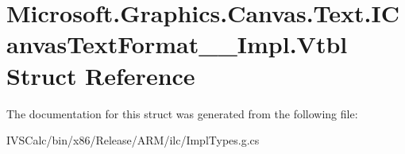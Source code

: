 \hypertarget{struct_microsoft_1_1_graphics_1_1_canvas_1_1_text_1_1_i_canvas_text_format_____impl_1_1_vtbl}{}\section{Microsoft.\+Graphics.\+Canvas.\+Text.\+I\+Canvas\+Text\+Format\+\_\+\+\_\+\+Impl.\+Vtbl Struct Reference}
\label{struct_microsoft_1_1_graphics_1_1_canvas_1_1_text_1_1_i_canvas_text_format_____impl_1_1_vtbl}


The documentation for this struct was generated from the following file\+:\begin{DoxyCompactItemize}
\item 
I\+V\+S\+Calc/bin/x86/\+Release/\+A\+R\+M/ilc/Impl\+Types.\+g.\+cs\end{DoxyCompactItemize}
